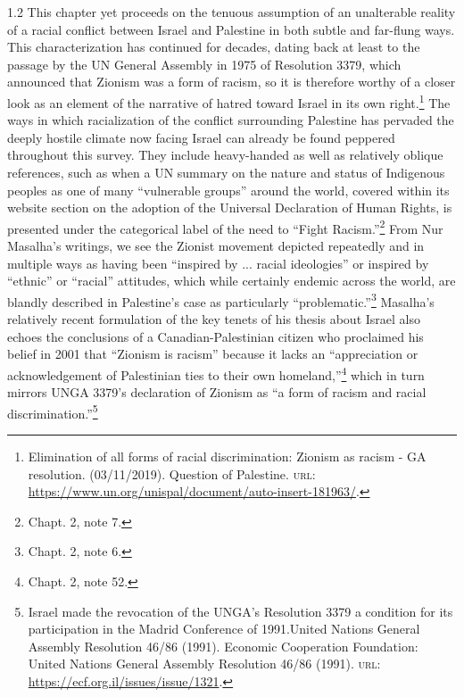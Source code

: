 \documentclass[../unravbook.tex]{subfiles}
\begin{document}
\begin{spacing}{1.2}
This chapter yet proceeds on the tenuous assumption of an unalterable reality of a racial conflict between Israel and Palestine in both subtle and far-flung ways. This characterization has continued for decades, dating back at least to the passage by the UN General Assembly in 1975 of Resolution 3379, which announced that Zionism was a form of racism, so it is therefore worthy of a closer look as an element of the narrative of hatred toward Israel in its own right.\footnote{Elimination of all forms of racial discrimination: Zionism as racism - GA resolution. (03/11/2019). Question of Palestine. \textsc{url: } \url{https://www.un.org/unispal/document/auto-insert-181963/}.}  The ways in which racialization of the conflict surrounding Palestine has pervaded the deeply hostile climate now facing Israel can already be found peppered throughout this survey. They include heavy-handed as well as relatively oblique references, such as when a  UN summary on the nature and status of Indigenous peoples as one of many ``vulnerable groups'' around the world, covered within its website section on the adoption of the Universal Declaration of Human Rights, is presented under the categorical label of the need to ``Fight Racism.''\footnote{Chapt. 2, note 7.} From Nur Masalha's writings, we see the Zionist movement depicted repeatedly and in multiple ways as having been ``inspired by ... racial ideologies'' or inspired by ``ethnic'' or ``racial'' attitudes, which while certainly endemic across the world, are blandly described in Palestine's case as particularly ``problematic.''\footnote{Chapt. 2, note 6.} Masalha's relatively recent formulation of the key tenets of his thesis about Israel also echoes the conclusions of a Canadian-Palestinian citizen who proclaimed his belief in 2001 that ``Zionism is racism'' because it lacks an ``appreciation or acknowledgement of Palestinian ties to their own homeland,''\footnote{Chapt. 2, note 52.} which in turn mirrors UNGA 3379's declaration of Zionism as ``a form of racism and racial discrimination.''\footnote{Israel made the revocation of the UNGA's Resolution 3379 a condition for its participation in the Madrid Conference of 1991.United Nations General Assembly Resolution 46/86 (1991). Economic Cooperation Foundation: United Nations General Assembly Resolution 46/86 (1991). \textsc{url: } \url{https://ecf.org.il/issues/issue/1321}.} 


\end{spacing}
\end{document}
